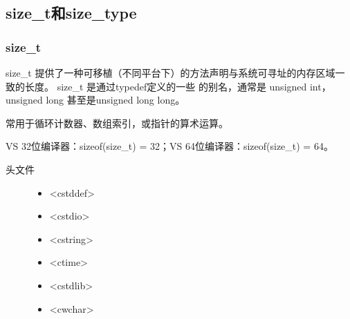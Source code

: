 \documentclass[letterpaper,10pt,english]{sphinxmanual}
\begin{document}
%
\begin{sphinxVerbatim}[commandchars=\\\{\}]
     
    
        
\end{sphinxVerbatim}


\subsection{size\_t和size\_type}
\label{\detokenize{cpp/19_stl:size-tsize-type}}

\subsubsection{size\_t}
\label{\detokenize{cpp/19_stl:size-t}}
size\_t 提供了一种可移植（不同平台下）的方法声明与系统可寻址的内存区域一致的长度。
size\_t 是通过typedef定义的一些  的别名，通常是 unsigned int，unsigned long 甚至是unsigned long long。

常用于循环计数器、数组索引，或指针的算术运算。

VS 32位编译器：sizeof(size\_t) = 32；VS 64位编译器：sizeof(size\_t) = 64。
\begin{description}
\item[{头文件}] \leavevmode\begin{itemize}
\item {} 
\textless{}cstddef\textgreater{}

\item {} 
\textless{}cstdio\textgreater{}

\item {} 
\textless{}cstring\textgreater{}

\item {} 
\textless{}ctime\textgreater{}

\item {} 
\textless{}cstdlib\textgreater{}

\item {} 
\textless{}cwchar\textgreater{}

\end{itemize}

\end{description}
\end{document}
